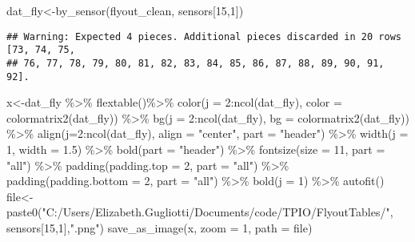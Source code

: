 \documentclass[
]{article}
\newenvironment{Shaded}{\begin{snugshade}}{\end{snugshade}}
\newcommand{\AttributeTok}[1]{\textcolor[rgb]{0.77,0.63,0.00}{#1}}
\newcommand{\DecValTok}[1]{\textcolor[rgb]{0.00,0.00,0.81}{#1}}
\newcommand{\FloatTok}[1]{\textcolor[rgb]{0.00,0.00,0.81}{#1}}
\newcommand{\FunctionTok}[1]{\textcolor[rgb]{0.00,0.00,0.00}{#1}}
\newcommand{\NormalTok}[1]{#1}
\newcommand{\OtherTok}[1]{\textcolor[rgb]{0.56,0.35,0.01}{#1}}
\newcommand{\SpecialCharTok}[1]{\textcolor[rgb]{0.00,0.00,0.00}{#1}}
\newcommand{\StringTok}[1]{\textcolor[rgb]{0.31,0.60,0.02}{#1}}
\begin{document}
\begin{Shaded}
\begin{Highlighting}[]
\NormalTok{dat\_fly}\OtherTok{\textless{}{-}}\FunctionTok{by\_sensor}\NormalTok{(flyout\_clean, sensors[}\DecValTok{15}\NormalTok{,}\DecValTok{1}\NormalTok{])}
\end{Highlighting}
\end{Shaded}

\begin{verbatim}
## Warning: Expected 4 pieces. Additional pieces discarded in 20 rows [73, 74, 75,
## 76, 77, 78, 79, 80, 81, 82, 83, 84, 85, 86, 87, 88, 89, 90, 91, 92].
\end{verbatim}

\begin{Shaded}
\begin{Highlighting}[]
\NormalTok{x}\OtherTok{\textless{}{-}}\NormalTok{dat\_fly }\SpecialCharTok{\%\textgreater{}\%}
    \FunctionTok{flextable}\NormalTok{()}\SpecialCharTok{\%\textgreater{}\%}
    \FunctionTok{color}\NormalTok{(}\AttributeTok{j =} \DecValTok{2}\SpecialCharTok{:}\FunctionTok{ncol}\NormalTok{(dat\_fly), }\AttributeTok{color =} \FunctionTok{colormatrix2}\NormalTok{(dat\_fly)) }\SpecialCharTok{\%\textgreater{}\%}
    \FunctionTok{bg}\NormalTok{(}\AttributeTok{j =} \DecValTok{2}\SpecialCharTok{:}\FunctionTok{ncol}\NormalTok{(dat\_fly), }\AttributeTok{bg =} \FunctionTok{colormatrix2}\NormalTok{(dat\_fly)) }\SpecialCharTok{\%\textgreater{}\%}
    \FunctionTok{align}\NormalTok{(}\AttributeTok{j=}\DecValTok{2}\SpecialCharTok{:}\FunctionTok{ncol}\NormalTok{(dat\_fly), }\AttributeTok{align =} \StringTok{"center"}\NormalTok{, }\AttributeTok{part =} \StringTok{"header"}\NormalTok{) }\SpecialCharTok{\%\textgreater{}\%}
    \FunctionTok{width}\NormalTok{(}\AttributeTok{j =} \DecValTok{1}\NormalTok{, }\AttributeTok{width =} \FloatTok{1.5}\NormalTok{) }\SpecialCharTok{\%\textgreater{}\%}
    \FunctionTok{bold}\NormalTok{(}\AttributeTok{part =} \StringTok{"header"}\NormalTok{) }\SpecialCharTok{\%\textgreater{}\%}
    \FunctionTok{fontsize}\NormalTok{(}\AttributeTok{size =} \DecValTok{11}\NormalTok{, }\AttributeTok{part =} \StringTok{"all"}\NormalTok{) }\SpecialCharTok{\%\textgreater{}\%}
    \FunctionTok{padding}\NormalTok{(}\AttributeTok{padding.top =} \DecValTok{2}\NormalTok{, }\AttributeTok{part =} \StringTok{"all"}\NormalTok{) }\SpecialCharTok{\%\textgreater{}\%}
    \FunctionTok{padding}\NormalTok{(}\AttributeTok{padding.bottom =} \DecValTok{2}\NormalTok{, }\AttributeTok{part =} \StringTok{"all"}\NormalTok{) }\SpecialCharTok{\%\textgreater{}\%}
    \FunctionTok{bold}\NormalTok{(}\AttributeTok{j =} \DecValTok{1}\NormalTok{) }\SpecialCharTok{\%\textgreater{}\%} \FunctionTok{autofit}\NormalTok{()}
\NormalTok{file}\OtherTok{\textless{}{-}}\FunctionTok{paste0}\NormalTok{(}\StringTok{"C:/Users/Elizabeth.Gugliotti/Documents/code/TPIO/FlyoutTables/"}\NormalTok{, sensors[}\DecValTok{15}\NormalTok{,}\DecValTok{1}\NormalTok{],}\StringTok{".png"}\NormalTok{)}
\FunctionTok{save\_as\_image}\NormalTok{(x, }\AttributeTok{zoom =} \DecValTok{1}\NormalTok{, }\AttributeTok{path =}\NormalTok{ file)}
\end{Highlighting}
\end{Shaded}
\end{document}
